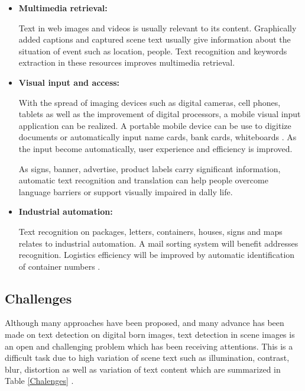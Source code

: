 \begin{itemize}
\item{\textbf{Multimedia retrieval:}}

Text in web images and videos is usually relevant to its content. Graphically added captions and captured scene text usually give information about the situation of event such as location, people. Text recognition and keywords extraction in these resources improves multimedia retrieval. 
\item{\textbf{Visual input and access:}}

With the spread of imaging devices such as digital cameras, cell phones, tablets as well as the improvement of digital processors, a mobile visual input application can be realized. A portable mobile device can be use to digitize documents or automatically input name cards, bank cards, whiteboards \cite{}. As the input become automatically, user experience and efficiency is improved. 

As signs, banner, advertise, product labels carry significant information, automatic text recognition and translation can help people overcome language barriers or support visually impaired in dally life. 

\item{\textbf{Industrial automation:}}

Text recognition on packages, letters, containers, houses, signs and maps relates to industrial automation. A mail sorting system will benefit addresses recognition. Logistics efficiency will be improved by automatic identification of container numbers \cite{39}.

\end{itemize}

\subsection{Challenges}

Although many approaches have been proposed, and many advance has been made on text detection on digital born images, text detection in scene images is an open and challenging problem which has been receiving attentions. This is a difficult task due to high variation of scene text such as illumination, contrast, blur, distortion as well as variation of text content \cite{Liang.2005.IJDAR} which are summarized in Table \ref{Chalenges} .

